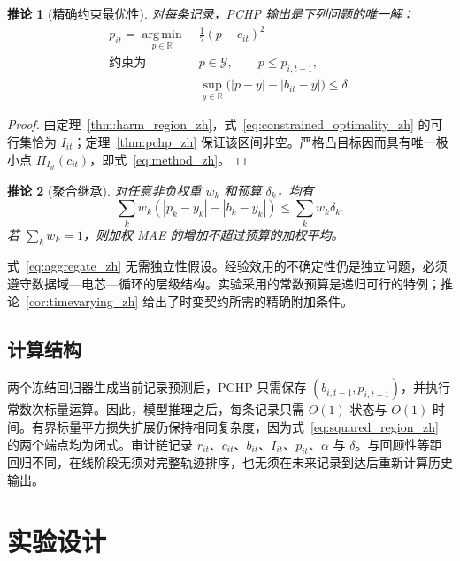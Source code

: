\documentclass[UTF8,11pt]{ctexart}
\newtheorem{corollary}{推论}
\newcommand{\R}{\mathbb{R}}
\begin{document}
\begin{corollary}[精确约束最优性]
\label{cor:optimality_zh}
对每条记录，PCHP 输出是下列问题的唯一解：
\begin{equation}
\begin{aligned}
  p_{it}=\operatorname*{arg\,min}_{p\in\R}\;&\frac{1}{2}(p-c_{it})^2\\
  \text{约束为}\quad
  &p\in\mathcal Y,\qquad p\leq p_{i,t-1},\\
  &\sup_{y\in\R}\bigl(|p-y|-|b_{it}-y|\bigr)\leq\delta.
\end{aligned}
\label{eq:constrained_optimality_zh}
\end{equation}
\end{corollary}
\begin{proof}
由定理~\ref{thm:harm_region_zh}，式~\eqref{eq:constrained_optimality_zh} 的可行集恰为 $I_{it}$；定理~\ref{thm:pchp_zh} 保证该区间非空。严格凸目标因而具有唯一极小点 $\Pi_{I_{it}}(c_{it})$，即式~\eqref{eq:method_zh}。
\end{proof}

\begin{corollary}[聚合继承]
对任意非负权重 $w_k$ 和预算 $\delta_k$，均有
\begin{equation}
  \sum_k w_k\left(|p_k-y_k|-|b_k-y_k|\right)
  \leq\sum_k w_k\delta_k.
  \label{eq:aggregate_zh}
\end{equation}
若 $\sum_k w_k=1$，则加权 MAE 的增加不超过预算的加权平均。
\end{corollary}

式~\eqref{eq:aggregate_zh} 无需独立性假设。经验效用的不确定性仍是独立问题，必须遵守数据域—电芯—循环的层级结构。实验采用的常数预算是递归可行的特例；推论~\ref{cor:timevarying_zh} 给出了时变契约所需的精确附加条件。

\subsection{计算结构}

两个冻结回归器生成当前记录预测后，PCHP 只需保存 $(b_{i,t-1},p_{i,t-1})$，并执行常数次标量运算。因此，模型推理之后，每条记录只需 $O(1)$ 状态与 $O(1)$ 时间。有界标量平方损失扩展仍保持相同复杂度，因为式~\eqref{eq:squared_region_zh} 的两个端点均为闭式。审计链记录 $r_{it}$、$c_{it}$、$b_{it}$、$I_{it}$、$p_{it}$、$\alpha$ 与 $\delta$。与回顾性等距回归不同，在线阶段无须对完整轨迹排序，也无须在未来记录到达后重新计算历史输出。

\section{实验设计}
\end{document}
